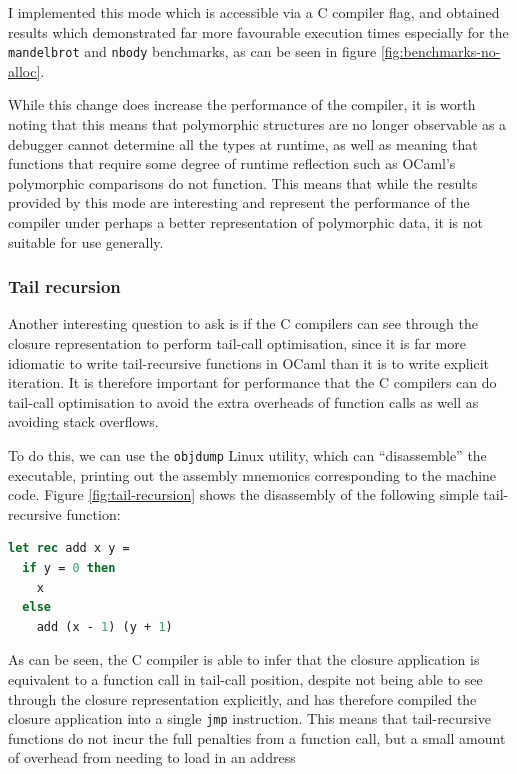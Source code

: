 \documentclass[12pt,a4paper,twoside,openright]{report}
\begin{document}
I implemented this mode which is accessible via a C compiler flag, and obtained 
results which demonstrated far more favourable execution times especially for 
the \texttt{mandelbrot} and \texttt{nbody} benchmarks, as can be seen in figure 
\ref{fig:benchmarks-no-alloc}.

While this change does increase the performance of the compiler, it is worth 
noting that this means that polymorphic structures are no longer observable as 
a debugger cannot determine all the types at runtime, as well as meaning that 
functions that require some degree of runtime reflection such as OCaml's 
polymorphic comparisons do not function. This means that while the results 
provided by this mode are interesting and represent the performance of the 
compiler under perhaps a better representation of polymorphic data, it is not 
suitable for use generally.

\subsubsection{Tail recursion} \label{tail-recursion}

Another interesting question to ask is if the C compilers can see through the 
closure representation to perform tail-call optimisation, since it is far more 
idiomatic to write tail-recursive functions in OCaml than it is to write 
explicit iteration. It is therefore important for performance that the C 
compilers can do tail-call optimisation to avoid the extra overheads of 
function calls as well as avoiding stack overflows.

To do this, we can use the \texttt{objdump} Linux utility, which can 
``disassemble'' the executable, printing out the assembly mnemonics 
corresponding to the machine code.  Figure \ref{fig:tail-recursion} shows the 
disassembly of the following simple tail-recursive function:

\begin{lstlisting}[language=Caml]
let rec add x y =
  if y = 0 then
    x
  else
    add (x - 1) (y + 1)
\end{lstlisting}

As can be seen, the C compiler is able to infer that the closure application is 
equivalent to a function call in tail-call position, despite not being able to 
see through the closure representation explicitly, and has therefore compiled 
the closure application into a single \texttt{jmp} instruction. This means that 
tail-recursive functions do not incur the full penalties from a function call, 
but a small amount of overhead from needing to load in an address
\end{document}

